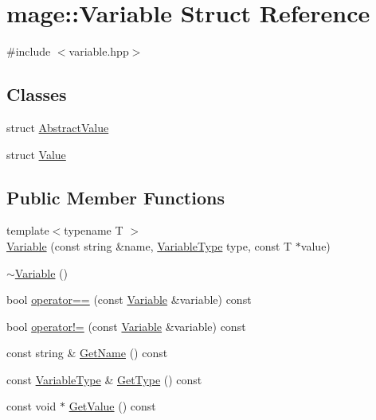 \hypertarget{structmage_1_1_variable}{}\section{mage\+:\+:Variable Struct Reference}
\label{structmage_1_1_variable}


{\ttfamily \#include $<$variable.\+hpp$>$}

\subsection*{Classes}
\begin{DoxyCompactItemize}
\item 
struct \hyperlink{structmage_1_1_variable_1_1_abstract_value}{Abstract\+Value}
\item 
struct \hyperlink{structmage_1_1_variable_1_1_value}{Value}
\end{DoxyCompactItemize}
\subsection*{Public Member Functions}
\begin{DoxyCompactItemize}
\item 
{\footnotesize template$<$typename T $>$ }\\\hyperlink{structmage_1_1_variable_a86a59487f5ae51954f75a27b6c9487ce}{Variable} (const string \&name, \hyperlink{namespacemage_a530428e73bac0ba7fe84b29086a9e33a}{Variable\+Type} type, const T $\ast$value)
\item 
\hyperlink{structmage_1_1_variable_a8f4d3e950b25b14e996ad074e42a5e9e}{$\sim$\+Variable} ()
\item 
bool \hyperlink{structmage_1_1_variable_a5d1f7965ca7d0e29f6879cda014e8fa9}{operator==} (const \hyperlink{structmage_1_1_variable}{Variable} \&variable) const
\item 
bool \hyperlink{structmage_1_1_variable_a7983cd74a25e3998abac8d89245d1fd9}{operator!=} (const \hyperlink{structmage_1_1_variable}{Variable} \&variable) const
\item 
const string \& \hyperlink{structmage_1_1_variable_a7f70fdadf34cdf6b26adc9910eade11d}{Get\+Name} () const
\item 
const \hyperlink{namespacemage_a530428e73bac0ba7fe84b29086a9e33a}{Variable\+Type} \& \hyperlink{structmage_1_1_variable_a5265e80b2a1c280fad5886174dfc997a}{Get\+Type} () const
\item 
const void $\ast$ \hyperlink{structmage_1_1_variable_a65ecc95bcdc26733394d3a32d3d698f1}{Get\+Value} () const
\end{DoxyCompactItemize}
